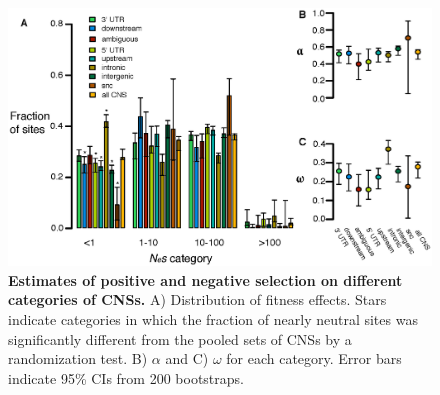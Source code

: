 \begin{figure}[h!]
      \centering
       \includegraphics[width=\linewidth]{Ch2FigS7}
    \caption{\textbf{Estimates of positive and negative selection on different categories of CNSs.} A) Distribution of fitness effects. Stars indicate categories in which the fraction of nearly neutral sites was significantly different from the pooled sets of CNSs by a randomization test. B) $\alpha$ and C) $\omega$ for each category. Error bars indicate 95\% CIs from 200 bootstraps.}
    \label{fig:figS7}
\end{figure}

